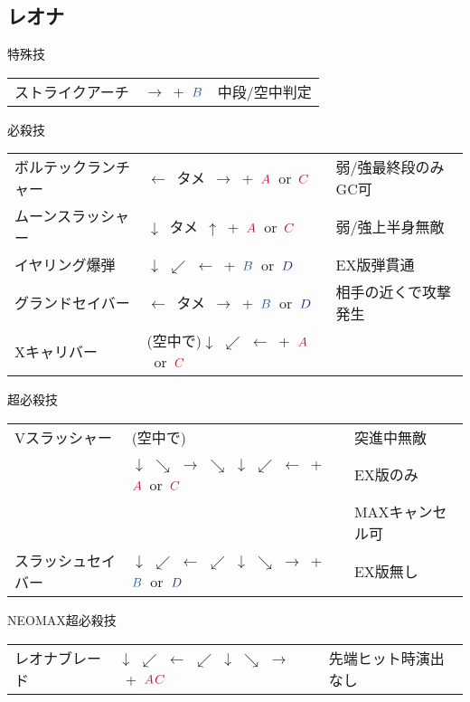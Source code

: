 \documentclass[a4j,11pt]{jarticle}
\def\A{$\textcolor{Acolor}{A}$}
\def\C{$\textcolor{Ccolor}{C}$}
\def\B{$\textcolor{Bcolor}{B}$}
\def\D{$\textcolor{Dcolor}{D}$}
\def\vtame{$\downarrow$\ タメ\ $\uparrow$}
\def\htame{$\leftarrow$\ タメ\ $\rightarrow$}
\def\tatsu{$\downarrow$ $\swarrow$ $\leftarrow$}%
\def\ryuko{$\downarrow$ $\searrow$ $\rightarrow$ $\searrow$ $\downarrow$ $\swarrow$ $\leftarrow$}%
\def\orochi{$\downarrow$ $\swarrow$ $\leftarrow$ $\swarrow$ $\downarrow$ $\searrow$ $\rightarrow$}%
\begin{document}
\subsection{レオナ}
\begin{itembox}[l]{特殊技}
\begin{tabular}{lll}
ストライクアーチ&$\rightarrow$\ +\ \B&中段/空中判定\\
\end{tabular}
\end{itembox}
\begin{itembox}[l]{必殺技}
\begin{tabular}{lll}
ボルテックランチャー&\htame\ +\ \A\ or\ \C&弱/強最終段のみGC可\\
ムーンスラッシャー&\vtame\ +\ \A\ or\ \C&弱/強上半身無敵\\
イヤリング爆弾&\tatsu\ +\ \B\ or\ \D&EX版弾貫通\\
グランドセイバー&\htame\ +\ \B\ or\ \D&相手の近くで攻撃発生\\
Xキャリバー&(空中で)\tatsu\ +\ \A\ or\ \C&
\end{tabular}
\end{itembox}
\begin{itembox}[l]{超必殺技}
\begin{tabular}{lll}
Vスラッシャー&(空中で)&突進中無敵\\
&\ryuko\ +\ \A\ or\ \C&EX版のみ\\
&&MAXキャンセル可\\
スラッシュセイバー&\orochi\ +\ \B\ or\ \D&EX版無し
\end{tabular}
\end{itembox}
\begin{itembox}[l]{NEOMAX超必殺技}
\begin{tabular}{lll}
レオナブレード&\orochi\ +\ \A\C&先端ヒット時演出なし
\end{tabular}
\end{itembox}
\newpage
\end{document}
